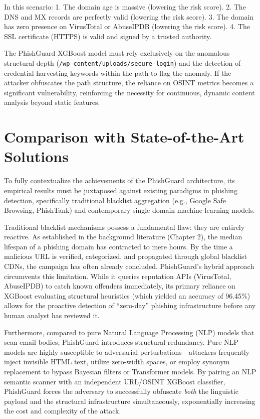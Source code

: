 In this scenario: 1. The domain age is massive (lowering the risk
score). 2. The DNS and MX records are perfectly valid (lowering the risk
score). 3. The domain has zero presence on VirusTotal or AbuseIPDB
(lowering the risk score). 4. The SSL certificate (HTTPS) is valid and
signed by a trusted authority.

The PhishGuard XGBoost model must rely exclusively on the anomalous
structural depth (\texttt{/wp-content/uploads/secure-login}) and the
detection of credential-harvesting keywords within the path to flag the
anomaly. If the attacker obfuscates the path structure, the reliance on
OSINT metrics becomes a significant vulnerability, reinforcing the
necessity for continuous, dynamic content analysis beyond static
features.

\section{Comparison with State-of-the-Art
Solutions}\label{comparison-with-state-of-the-art-solutions}

To fully contextualize the achievements of the PhishGuard architecture,
its empirical results must be juxtaposed against existing paradigms in
phishing detection, specifically traditional blacklist aggregation
(e.g., Google Safe Browsing, PhishTank) and contemporary single-domain
machine learning models.

Traditional blacklist mechanisms possess a fundamental flaw: they are
entirely reactive. As established in the background literature (Chapter
2), the median lifespan of a phishing domain has contracted to mere
hours. By the time a malicious URL is verified, categorized, and
propagated through global blacklist CDNs, the campaign has often already
concluded. PhishGuard's hybrid approach circumvents this limitation.
While it queries reputation APIs (VirusTotal, AbuseIPDB) to catch known
offenders immediately, its primary reliance on XGBoost evaluating
structural heuristics (which yielded an accuracy of 96.45\%) allows for
the proactive detection of ``zero-day'' phishing infrastructure before
any human analyst has reviewed it.

Furthermore, compared to pure Natural Language Processing (NLP) models
that scan email bodies, PhishGuard introduces structural redundancy.
Pure NLP models are highly susceptible to adversarial
perturbations---attackers frequently inject invisible HTML text, utilize
zero-width spaces, or employ synonym replacement to bypass Bayesian
filters or Transformer models. By pairing an NLP semantic scanner with
an independent URL/OSINT XGBoost classifier, PhishGuard forces the
adversary to successfully obfuscate \emph{both} the linguistic payload
and the structural infrastructure simultaneously, exponentially
increasing the cost and complexity of the attack.

